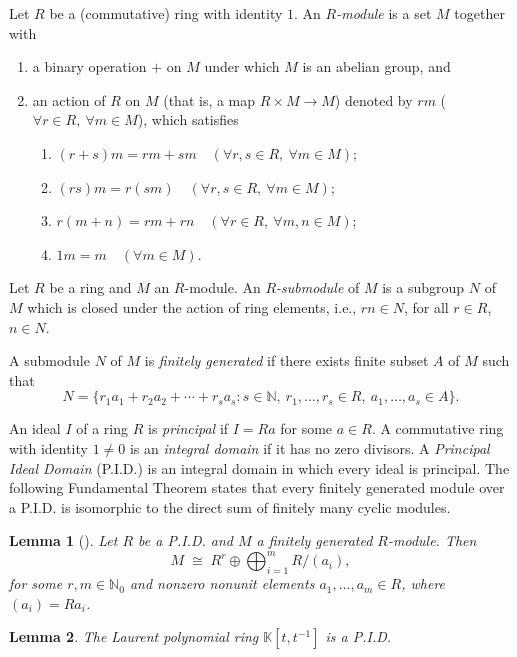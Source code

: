 \documentclass[11pt]{amsart}
\newtheorem{lemma}{Lemma}
\theoremstyle{definition}
\theoremstyle{remark}
\theoremstyle{plain}
\begin{document}
Let \(R\) be a (commutative) ring with identity $1$.
An \textit{\(R\)-module} is a set $M$ together with
\begin{enumerate}
  \item[(1)] a binary operation $+$ on $M$ under which $M$ is an
  abelian group, and
  \item[(2)] an action of $R$ on $M$ (that is, a map
  $R\times M\to M$) denoted by $rm$ ($\forall r\in R,\
  \forall m\in M$), which satisfies
  \begin{enumerate}
    \item[(i)] $(r+s)m=rm+sm \quad (\forall r, s\in R, \ \forall m\in M)$;
    \item[(ii)] $(rs)m=r(sm) \quad (\forall r, s\in R, \ \forall m\in M)$;
    \item[(iii)] $r(m+n)=rm+rn \quad (\forall r\in R, \ \forall m, n\in M)$;
    \item[(iv)] $1m=m\quad (\forall m\in M)$.
  \end{enumerate}
\end{enumerate}

Let \(R\) be a ring and $M$ an \(R\)-module.
An \textit{$R$-submodule} of $M$ is a subgroup $N$ of $M$ which is
closed under the action of ring elements, i.e., $rn\in N$,
for all $r\in R$, $n\in N$.

A submodule $N$ of $M$ is \textit{finitely generated} if there exists
finite subset $A$ of $M$ such that
\[
N=\{r_1a_1+r_2a_2+\cdots+r_sa_s:
s\in\mathbb{N},\ r_1, \ldots, r_s\in R,\
a_1, \ldots, a_s\in A\}.
\]


An ideal \(I\) of a ring \(R\) is \textit{principal} if \(I=Ra\) for some \(a\in R\).
A commutative ring with identity $1\neq 0$ is an \textit{integral domain}
if it has  no zero divisors. A \textit{Principal Ideal
Domain} (P.I.D.) is an integral domain in which every ideal is principal.  The
following Fundamental Theorem states that every finitely generated module
over a P.I.D. is isomorphic to the direct sum of finitely many cyclic modules.

\begin{lemma}
[{\textrm{\protect\cite[Chap.~12, Theorem~5]{DF}}}]
\label{thm:PID-module-structure}
Let \(R\) be a P.I.D. and \(M\) a finitely generated \(R\)-module.
Then
\[
M \;\cong\; R^{r}\oplus\bigoplus_{i=1}^{m}R\big/(a_i),
\]
for some \(r,m\in\mathbb{N}_0\) and nonzero nonunit elements
\(a_1, \ldots, a_m\in R\), where \((a_i)=Ra_i\).
\end{lemma}

\begin{lemma}\label{lem:laurent-polynomial-PID}
The Laurent polynomial ring \(\mathbb{K}[t,t^{-1}]\) is a P.I.D.
\end{lemma}
\end{document}
